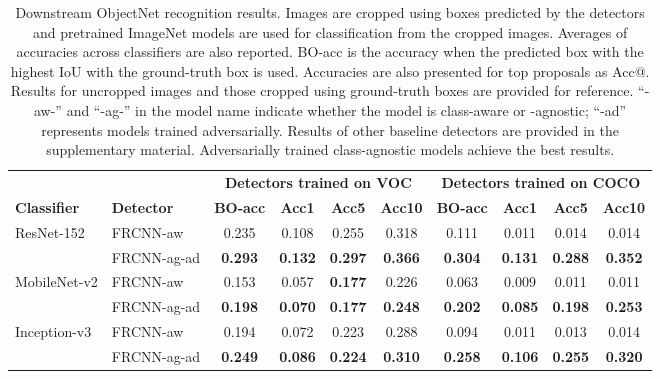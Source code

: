 \documentclass[10pt,twocolumn,letterpaper]{article}
\begin{document}
\begin{table*}
\centering
\caption{\label{tab:objectnet}Downstream ObjectNet recognition results. Images are cropped using boxes predicted by the detectors and pretrained ImageNet models are used for classification from the cropped images. Averages of accuracies across classifiers are also reported. BO-acc is the accuracy when the predicted box with the highest IoU with the ground-truth box is used. Accuracies are also presented for top  proposals as Acc@. Results for uncropped images and those cropped using ground-truth boxes are provided for reference. ``-aw-'' and ``-ag-'' in the model name indicate whether the model is class-aware or -agnostic; ``-ad'' represents models trained adversarially. Results of other baseline detectors are provided in the supplementary material. Adversarially trained class-agnostic models achieve the best results.}
\setlength{\tabcolsep}{0.6em} \begin{tabular}{l l c c c c c c c c}
 \toprule
 & & \multicolumn{4}{c}{\textbf{Detectors trained on VOC}} & \multicolumn{4}{c}{\textbf{Detectors trained on COCO}} \\
 \cmidrule(lr){3-6} \cmidrule(lr){7-10}
 \textbf{Classifier} & \textbf{Detector} & \textbf{BO-acc} & \textbf{Acc1} & \textbf{Acc5} & \textbf{Acc10} & \textbf{BO-acc} & \textbf{Acc1} & \textbf{Acc5} & \textbf{Acc10} \\
\cmidrule(r){1-1} \cmidrule(lr){2-2} \cmidrule(lr){3-3} \cmidrule(lr){4-6}\cmidrule(lr){7-7} \cmidrule(lr){8-10}
\multirow{2}{*}{ResNet-152} & FRCNN-aw & 0.235 & 0.108 & 0.255 & 0.318 & 0.111 & 0.011 & 0.014 & 0.014 \\
  & FRCNN-ag-ad & \textbf{0.293} & \textbf{0.132} & \textbf{0.297} & \textbf{0.366} & \textbf{0.304} & \textbf{0.131} & \textbf{0.288} & \textbf{0.352} \\
 \cmidrule[0.1pt](r){1-2} \cmidrule[0.1pt](lr){3-6} \cmidrule[0.1pt](lr){7-10}
  \multirow{2}{*}{MobileNet-v2} & FRCNN-aw & 0.153 & 0.057 & \textbf{0.177} & 0.226 & 0.063 & 0.009 & 0.011 & 0.011 \\
    & FRCNN-ag-ad & \textbf{0.198} & \textbf{0.070} & \textbf{0.177} & \textbf{0.248} & \textbf{0.202} & \textbf{0.085} & \textbf{0.198} & \textbf{0.253} \\
\cmidrule[0.1pt](r){1-2} \cmidrule[0.1pt](lr){3-6} \cmidrule[0.1pt](lr){7-10}
  \multirow{2}{*}{Inception-v3} & FRCNN-aw & 0.194 & 0.072 & 0.223 & 0.288 & 0.094 & 0.011 & 0.013 & 0.014 \\
    & FRCNN-ag-ad & \textbf{0.249} & \textbf{0.086} & \textbf{0.224} & \textbf{0.310} & \textbf{0.258} & \textbf{0.106} & \textbf{0.255} & \textbf{0.320} \\

\end{tabular}
\end{table*}
\end{document}
